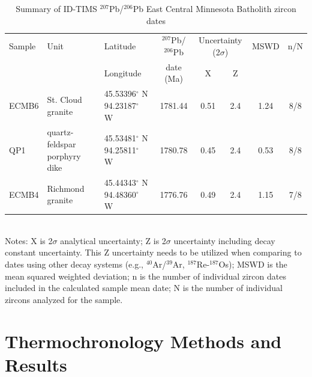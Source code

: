\documentclass[draft]{agujournal2019}
\begin{document}
\begin{table}[h!]
\footnotesize
\caption{Summary of ID-TIMS $^{207}$Pb/$^{206}$Pb East Central Minnesota Batholith zircon dates}
\begin{tabular}{p{1 cm}p{2.4 cm}p{1.8 cm}ccccc}
\hline
Sample & Unit & Latitude & $^{207}$Pb/$^{206}$Pb & \multicolumn{2}{c}{Uncertainty (2$\sigma$)} & MSWD & n/N \\
 &  & Longitude & date (Ma) & X & Z & & \\
\hline
ECMB6 & St. Cloud granite & 45.53396$^{\circ}$ N 94.23187$^{\circ}$ W & 1781.44 & 0.51 & 2.4 & 1.24 & 8/8 \\
QP1 & quartz-feldspar porphyry dike & 45.53481$^{\circ}$ N 94.25811$^{\circ}$ W & 1780.78 & 0.45 & 2.4 & 0.53 & 8/8 \\
ECMB4 & Richmond granite & 45.44343$^{\circ}$ N 94.48360$^{\circ}$ W & 1776.76 & 0.49 & 2.4 & 1.15 & 7/8 \\
\hline
\end{tabular}\\
Notes: X is 2$\sigma$ analytical uncertainty; Z is 2$\sigma$ uncertainty including decay constant uncertainty. This Z uncertainty needs to be utilized when comparing to dates using other decay systems (e.g., $^{40}$Ar/$^{39}$Ar, $^{187}$Re-$^{187}$Os); MSWD is the mean squared weighted deviation; n is the number of individual zircon dates included in the calculated sample mean date; N is the number of individual zircons analyzed for the sample.
\label{tab:geochron}
\end{table}

\section*{Thermochronology Methods and Results}
\end{document}
